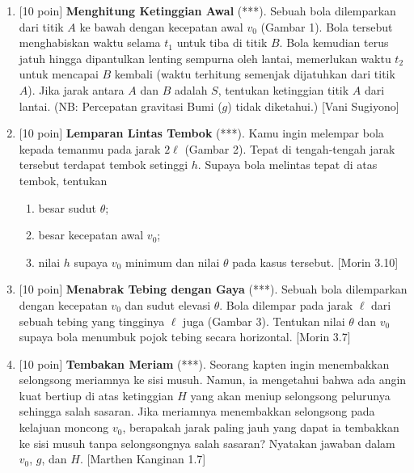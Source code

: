 \documentclass[12pt, a4paper]{article}\usepackage[utf8]{inputenc}
\theoremstyle{definition}
\theoremstyle{definition}
\begin{document}
\begin{enumerate}
\begin{figure}
{
			}
		\end{figure}
		
		\item $[$10 poin$]$ \textbf{Menghitung Ketinggian Awal} (***). Sebuah bola dilemparkan dari titik $A$ ke bawah dengan kecepatan awal $v_0$ (Gambar 1). Bola tersebut menghabiskan waktu selama $t_1$ untuk tiba di titik $B$. Bola kemudian terus jatuh hingga dipantulkan lenting sempurna oleh lantai, memerlukan waktu $t_2$ untuk mencapai $B$ kembali (waktu terhitung semenjak dijatuhkan dari titik $A$). Jika jarak antara $A$ dan $B$ adalah $S$, tentukan ketinggian titik $A$ dari lantai. (NB: Percepatan gravitasi Bumi ($g$) tidak diketahui.) [Vani Sugiyono]
		
		\item $[$10 poin$]$ \textbf{Lemparan Lintas Tembok} (***). Kamu ingin melempar bola kepada temanmu pada jarak $2 \ell$ (Gambar 2). Tepat di tengah-tengah jarak tersebut terdapat tembok setinggi $h$. Supaya bola melintas tepat di atas tembok, tentukan
		
		\begin{enumerate}[label=(\alph*)]
			\item besar sudut $\theta$;
			\item besar kecepatan awal $v_0$;
			\item nilai $h$ supaya $v_0$ minimum dan nilai $\theta$ pada kasus tersebut. [Morin 3.10]
		\end{enumerate}
		
		\item $[$10 poin$]$ \textbf{Menabrak Tebing dengan Gaya} (***). Sebuah bola dilemparkan dengan kecepatan $v_0$ dan sudut elevasi $\theta$. Bola dilempar pada jarak $\ell$ dari sebuah tebing yang tingginya $\ell$ juga (Gambar 3). Tentukan nilai $\theta$ dan $v_0$ supaya bola menumbuk pojok tebing secara horizontal. [Morin 3.7]
		
		\item $[$10 poin$]$ \textbf{Tembakan Meriam} (***). Seorang kapten ingin menembakkan selongsong meriamnya ke sisi musuh. Namun, ia mengetahui bahwa ada angin kuat bertiup di atas ketinggian $H$ yang akan meniup selongsong pelurunya sehingga salah sasaran. Jika meriamnya menembakkan selongsong pada kelajuan moncong $v_0$, berapakah jarak paling jauh yang dapat ia tembakkan ke sisi musuh tanpa selongsongnya salah sasaran? Nyatakan jawaban dalam $v_0$, $g$, dan $H$. [Marthen Kanginan 1.7]
		

\end{enumerate}
\end{document}
